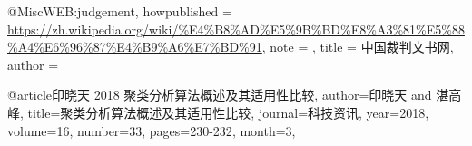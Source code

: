 @Misc{WEB:judgement,
  howpublished = {\url{https://zh.wikipedia.org/wiki/%E4%B8%AD%E5%9B%BD%E8%A3%81%E5%88%A4%E6%96%87%E4%B9%A6%E7%BD%91}},
  note = {},
  title = {中国裁判文书网},
  author = {}
}

@article{印晓天 2018 聚类分析算法概述及其适用性比较,
  author={印晓天 and 湛高峰},
  title={聚类分析算法概述及其适用性比较},
  journal={科技资讯},
  year={2018},
  volume={16},
  number={33},
  pages={230-232},
  month={3},
}